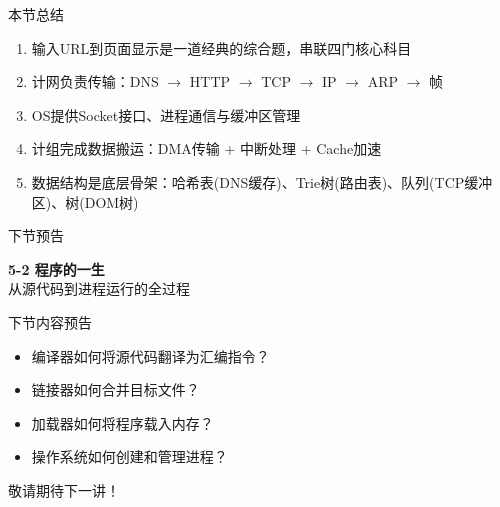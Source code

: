 \documentclass[10pt, aspectratio=169]{beamer}
\begin{document}
\begin{frame}{本节总结}
    \begin{enumerate}
        \item 输入URL到页面显示是一道经典的综合题，串联四门核心科目
        \item 计网负责传输：DNS $\to$ HTTP $\to$ TCP $\to$ IP $\to$ ARP $\to$ 帧
        \item OS提供Socket接口、进程通信与缓冲区管理
        \item 计组完成数据搬运：DMA传输 + 中断处理 + Cache加速
        \item 数据结构是底层骨架：哈希表(DNS缓存)、Trie树(路由表)、队列(TCP缓冲区)、树(DOM树)
    \end{enumerate}
\end{frame}

\begin{frame}{下节预告}
    \begin{center}
    \vspace{1em}
    {\Large \textbf{5-2 程序的一生}}\\
    \vspace{0.5em}
    \textcolor{408blue}{从源代码到进程运行的全过程}
    \vspace{1em}
    \begin{block}{下节内容预告}
        \begin{itemize}
            \item 编译器如何将源代码翻译为汇编指令？
            \item 链接器如何合并目标文件？
            \item 加载器如何将程序载入内存？
            \item 操作系统如何创建和管理进程？
        \end{itemize}
    \end{block}
    \vspace{1em}
    \textcolor{408orange}{敬请期待下一讲！}
    \end{center}
\end{frame}
\end{document}
